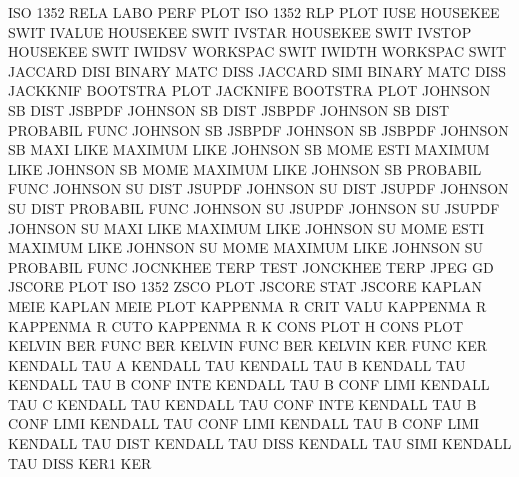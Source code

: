 ISO      1352 RELA LABO PERF PLOT       ISO      1352 RLP  PLOT
IUSE                                    HOUSEKEE SWIT
IVALUE                                  HOUSEKEE SWIT
IVSTAR                                  HOUSEKEE SWIT
IVSTOP                                  HOUSEKEE SWIT
IWIDSV                                  WORKSPAC SWIT
IWIDTH                                  WORKSPAC SWIT
JACCARD  DISI                           BINARY   MATC DISS
JACCARD  SIMI                           BINARY   MATC DISS
JACKKNIF                                BOOTSTRA PLOT
JACKNIFE                                BOOTSTRA PLOT
JOHNSON  SB   DIST                      JSBPDF
JOHNSON  SB   DIST                      JSBPDF
JOHNSON  SB   DIST                      PROBABIL FUNC
JOHNSON  SB                             JSBPDF
JOHNSON  SB                             JSBPDF
JOHNSON  SB   MAXI LIKE                 MAXIMUM  LIKE
JOHNSON  SB   MOME ESTI                 MAXIMUM  LIKE
JOHNSON  SB   MOME                      MAXIMUM  LIKE
JOHNSON  SB                             PROBABIL FUNC
JOHNSON  SU   DIST                      JSUPDF
JOHNSON  SU   DIST                      JSUPDF
JOHNSON  SU   DIST                      PROBABIL FUNC
JOHNSON  SU                             JSUPDF
JOHNSON  SU                             JSUPDF
JOHNSON  SU   MAXI LIKE                 MAXIMUM  LIKE
JOHNSON  SU   MOME ESTI                 MAXIMUM  LIKE
JOHNSON  SU   MOME                      MAXIMUM  LIKE
JOHNSON  SU                             PROBABIL FUNC
JOCNKHEE TERP TEST                      JONCKHEE TERP
JPEG                                    GD
JSCORE   PLOT                           ISO      1352 ZSCO PLOT
JSCORE   STAT                           JSCORE
KAPLAN   MEIE                           KAPLAN   MEIE PLOT
KAPPENMA R    CRIT VALU                 KAPPENMA R
KAPPENMA R    CUTO                      KAPPENMA R
K        CONS PLOT                      H        CONS PLOT
KELVIN   BER  FUNC                      BER
KELVIN   FUNC                           BER
KELVIN   KER  FUNC                      KER
KENDALL  TAU  A                         KENDALL  TAU
KENDALL  TAU  B                         KENDALL  TAU
KENDALL  TAU  B    CONF INTE            KENDALL  TAU  B    CONF LIMI
KENDALL  TAU  C                         KENDALL  TAU
KENDALL  TAU  CONF INTE                 KENDALL  TAU  B    CONF LIMI
KENDALL  TAU  CONF LIMI                 KENDALL  TAU  B    CONF LIMI
KENDALL  TAU  DIST                      KENDALL  TAU  DISS
KENDALL  TAU  SIMI                      KENDALL  TAU  DISS
KER1                                    KER
